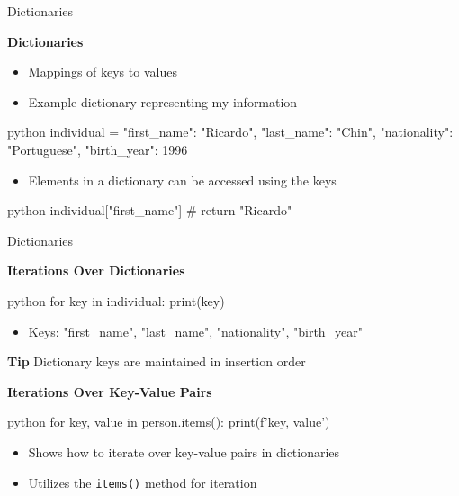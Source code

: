 \documentclass[
	11pt, 
]{beamer}
\begin{document}

\begin{frame}[fragile]{Dictionaries}

\textbf{Dictionaries}

\begin{itemize}
    \item Mappings of keys to values
    \item Example dictionary representing my information
\end{itemize}

\begin{mintedbox}{python}
individual = {
    "first_name": "Ricardo",
    "last_name": "Chin",
    "nationality": "Portuguese",
    "birth_year": 1996
}
\end{mintedbox}

\begin{itemize}
    \item Elements in a dictionary can be accessed using the keys
\end{itemize}

\begin{mintedbox}{python}
individual["first_name"]  # return "Ricardo"
\end{mintedbox}

\end{frame}


\begin{frame}[fragile]{Dictionaries}

\textbf{Iterations Over Dictionaries}

\begin{mintedbox}{python}
for key in individual:
    print(key)
\end{mintedbox}

\begin{itemize}
    \item Keys: "first\_name", "last\_name", "nationality", "birth\_year"
\end{itemize}

\begin{exampleblock}{\textbf{Tip}}
    Dictionary keys are maintained in insertion order
\end{exampleblock}

\textbf{Iterations Over Key-Value Pairs}
\begin{mintedbox}{python}
for key, value in person.items():
    print(f'{key}, {value}')
\end{mintedbox}

\begin{itemize}
    \item Shows how to iterate over key-value pairs in dictionaries
    \item Utilizes the \texttt{items()} method for iteration
\end{itemize}
\end{frame}
\end{document}
